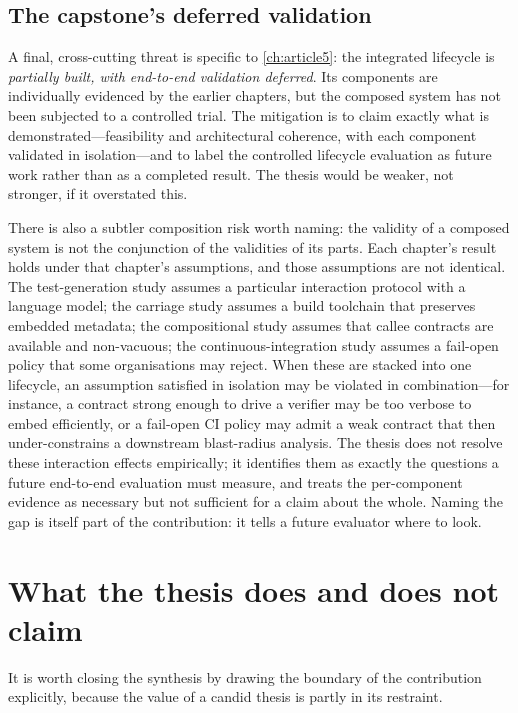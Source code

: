 \subsection{The capstone's deferred validation}

A final, cross-cutting threat is specific to \cref{ch:article5}: the integrated
lifecycle is \emph{partially built, with end-to-end validation deferred}. Its
components are individually evidenced by the earlier chapters, but the composed
system has not been subjected to a controlled trial. The mitigation is to claim
exactly what is demonstrated---feasibility and architectural coherence, with each
component validated in isolation---and to label the controlled lifecycle evaluation
as future work rather than as a completed result. The thesis would be weaker, not
stronger, if it overstated this.

There is also a subtler composition risk worth naming: the validity of a composed
system is not the conjunction of the validities of its parts. Each chapter's result
holds under that chapter's assumptions, and those assumptions are not identical. The
test-generation study assumes a particular interaction protocol with a language
model; the carriage study assumes a build toolchain that preserves embedded
metadata; the compositional study assumes that callee contracts are available and
non-vacuous; the continuous-integration study assumes a fail-open policy that some
organisations may reject. When these are stacked into one lifecycle, an assumption
satisfied in isolation may be violated in combination---for instance, a contract
strong enough to drive a verifier may be too verbose to embed efficiently, or a
fail-open CI policy may admit a weak contract that then under-constrains a
downstream blast-radius analysis. The thesis does not resolve these interaction
effects empirically; it identifies them as exactly the questions a future
end-to-end evaluation must measure, and treats the per-component evidence as
necessary but not sufficient for a claim about the whole. Naming the gap is itself
part of the contribution: it tells a future evaluator where to look.

\section{What the thesis does and does not claim}

It is worth closing the synthesis by drawing the boundary of the contribution
explicitly, because the value of a candid thesis is partly in its restraint.

